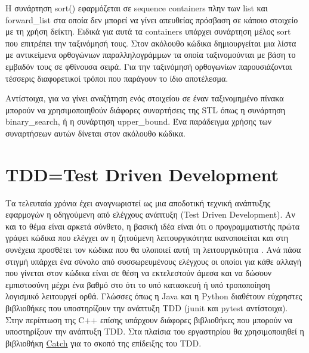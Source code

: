 



Η συνάρτηση sort() εφαρμόζεται σε sequence containers πλην των list και forward\_list στα οποία δεν μπορεί να γίνει απευθείας πρόσβαση σε κάποιο στοιχείο με τη χρήση δείκτη. Ειδικά για αυτά τα containers υπάρχει συνάρτηση μέλος sort που επιτρέπει την ταξινόμησή τους. Στον ακόλουθο κώδικα δημιουργείται μια λίστα με αντικείμενα ορθογώνιων παραλληλογράμμων τα οποία ταξινομούνται με βάση το εμβαδόν τους σε φθίνουσα σειρά. Για την ταξινόμησή ορθογωνίων παρουσιάζονται τέσσερις διαφορετικοί τρόποι που παράγουν το ίδιο αποτέλεσμα.












Αντίστοιχα, για να γίνει αναζήτηση ενός στοιχείου σε έναν ταξινομημένο πίνακα μπορούν να χρησιμοποιηθούν διάφορες συναρτήσεις της STL όπως η συνάρτηση binary\_search, ή η συνάρτηση upper\_bound. Ένα παράδειγμα χρήσης των συναρτήσεων αυτών δίνεται στον ακόλουθο κώδικα.





\section{TDD=Test Driven Development}
Τα τελευταία χρόνια έχει αναγνωριστεί ως μια αποδοτική τεχνική ανάπτυξης εφαρμογών η οδηγούμενη από ελέγχους ανάπτυξη (Test Driven Development). Αν και το θέμα είναι αρκετά σύνθετο, η βασική ιδέα είναι ότι ο προγραμματιστής πρώτα γράφει κώδικα που ελέγχει αν η ζητούμενη λειτουργικότητα ικανοποιείται και στη συνέχεια προσθέτει τον κώδικα που θα υλοποιεί αυτή τη λειτουργικότητα \cite{butunclebob_tdd}. Ανά πάσα στιγμή υπάρχει ένα σύνολο από συσσωρευμένους ελέγχους οι οποίοι για κάθε αλλαγή που γίνεται στον κώδικα είναι σε θέση να εκτελεστούν άμεσα και να δώσουν εμπιστοσύνη μέχρι ένα βαθμό στο ότι το υπό κατασκευή ή υπό τροποποίηση λογισμικό λειτουργεί ορθά. Γλώσσες όπως η Java και η Python διαθέτουν εύχρηστες βιβλιοθήκες που υποστηρίζουν την ανάπτυξη TDD (junit και pytest αντίστοιχα). Στην περίπτωση της C++ επίσης υπάρχουν διάφορες βιβλιοθήκες που μπορούν να υποστηρίξουν την ανάπτυξη TDD. Στα πλαίσια του εργαστηρίου θα χρησιμοποιηθεί η βιβλιοθήκη \href{https://github.com/philsquared/Catch}{Catch} για το σκοπό της επίδειξης του TDD.

